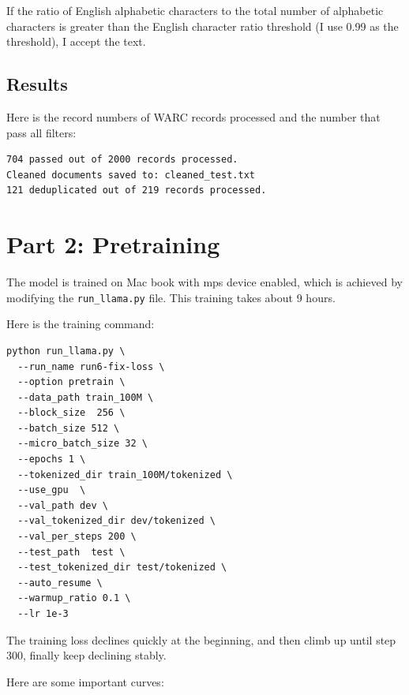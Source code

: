 \documentclass[11pt,a4paper]{article}
\begin{document}
If the ratio of English alphabetic characters to the total number of alphabetic characters is greater than the English character ratio threshold (I use 0.99 as the threshold), I accept the text.

\subsection{Results}

Here is the record numbers of WARC records processed and the number that pass all filters:


\begin{lstlisting}
704 passed out of 2000 records processed.
Cleaned documents saved to: cleaned_test.txt
121 deduplicated out of 219 records processed.
\end{lstlisting}

\section{Part 2: Pretraining}

The model is trained on Mac book with mps device enabled, which is achieved by modifying the \texttt{run\_llama.py} file. This training takes about 9 hours.

Here is the training command:
\begin{lstlisting}
python run_llama.py \
  --run_name run6-fix-loss \
  --option pretrain \
  --data_path train_100M \
  --block_size  256 \
  --batch_size 512 \
  --micro_batch_size 32 \
  --epochs 1 \
  --tokenized_dir train_100M/tokenized \
  --use_gpu  \
  --val_path dev \
  --val_tokenized_dir dev/tokenized \
  --val_per_steps 200 \
  --test_path  test \
  --test_tokenized_dir test/tokenized \
  --auto_resume \
  --warmup_ratio 0.1 \
  --lr 1e-3 
\end{lstlisting}

The training loss declines quickly at the beginning, and then climb up until step 300, finally keep declining stably.

Here are some important curves:
\end{document}
